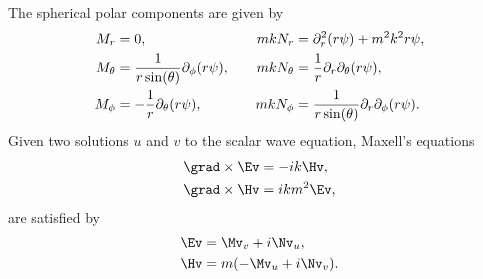 % 
The spherical polar components are given by
\begin{alignat}{3}
  M_r &=0 ,                                                    & m k N_r &= \partial_r^2 (r\psi) + m^2 k^2 r\psi, \label{eq:MNa} \\
  M_\theta &= {1\over r\sin(\theta)}\partial_\phi(r\psi),\quad & m k N_\theta &= {1\over r}\partial_r\partial_\theta(r\psi), 
                                      \label{eq:MNb} \\
  M_\phi   &=-{1\over r}\partial_\theta(r\psi),\quad & m k N_\phi &= {1\over r\sin(\theta)}\partial_r\partial_\phi(r\psi).
                                      \label{eq:MNc}
\end{alignat}
%
Given two solutions $u$ and $v$ to the scalar wave equation, Maxell's equations 
\begin{align*}
  \grad\times \Ev &= -i k \Hv,\\
  \grad\times\Hv &= i k m^2 \Ev, 
\end{align*}
are satisfied by
\begin{align}
  \Ev &= \Mv_v + i \Nv_u,            \label{eq:EfromMN} \\
  \Hv &= m(-\Mv_u + i \Nv_v).         \label{eq:HfromMN}
\end{align}

